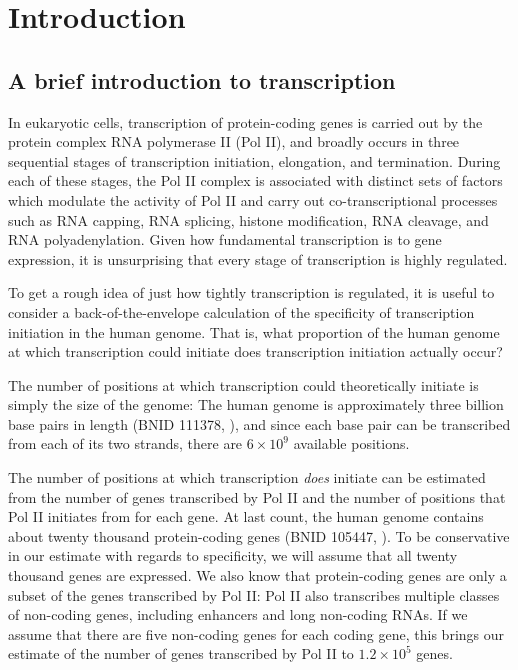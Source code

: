 \chapter{Introduction}

\section{A brief introduction to transcription}

In eukaryotic cells, transcription of protein-coding genes is carried out by the protein complex RNA polymerase II (Pol II), and broadly occurs in three sequential stages of transcription initiation, elongation, and termination.
During each of these stages, the Pol II complex is associated with distinct sets of factors which modulate the activity of Pol II and carry out co-transcriptional processes such as RNA capping, RNA splicing, histone modification, RNA cleavage, and RNA polyadenylation.
Given how fundamental transcription is to gene expression, it is unsurprising that every stage of transcription is highly regulated.

To get a rough idea of just how tightly transcription is regulated, it is useful to consider a back-of-the-envelope calculation of the specificity of transcription initiation in the human genome.
That is, what proportion of the human genome at which transcription could initiate does transcription initiation actually occur?

The number of positions at which transcription could theoretically initiate is simply the size of the genome: The human genome is approximately three billion base pairs in length (BNID 111378, \citet{griffin2009}), and since each base pair can be transcribed from each of its two strands, there are $6 \times 10^9$ available positions.

The number of positions at which transcription \textit{does} initiate can be estimated from the number of genes transcribed by Pol II and the number of positions that Pol II initiates from for each gene.
At last count, the human genome contains about twenty thousand protein-coding genes (BNID 105447, \citet{griffin2009}).
To be conservative in our estimate with regards to specificity, we will assume that all twenty thousand genes are expressed.
We also know that protein-coding genes are only a subset of the genes transcribed by Pol II: Pol II also transcribes multiple classes of non-coding genes, including enhancers and long non-coding RNAs.
If we assume that there are five non-coding genes for each coding gene, this brings our estimate of the number of genes transcribed by Pol II to $1.2 \times 10^5$ genes.

